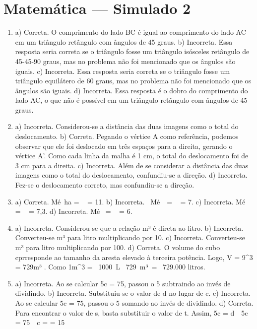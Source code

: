 \section*{Matemática — Simulado 2}

\begin{enumerate}
\item a) Correta. O comprimento do lado BC é igual ao comprimento do lado AC em um triângulo retângulo com ângulos de 45 graus.
b) Incorreta. Essa resposta seria correta se o triângulo fosse um triângulo isósceles retângulo de 45-45-90 graus, mas no problema não foi mencionado que os ângulos são iguais.
c) Incorreta. Essa resposta seria correta se o triângulo fosse um triângulo equilátero de 60 graus, mas no problema não foi mencionado que os ângulos são iguais.
d) Incorreta. Essa resposta é o dobro do comprimento do lado AC, o que não é possível em um triângulo retângulo com ângulos de 45 graus.


\item a) Incorreta. Considerou-se a distância das duas imagens como o total do deslocamento.
b) Correta. Pegando o vértice A como referência, podemos observar que ele foi deslocado em três espaços para a direita, gerando o vértice
A'. Como cada linha da malha é 1 cm, o total do deslocamento foi de 3 cm para a direita.
c) Incorreta. Além de se considerar a distância das duas imagens como o total do deslocamento, confundiu-se a direção.
d) Incorreta. Fez-se o deslocamento correto, mas confundiu-se a direção.

\item a) Correta.
Mé\ ha = \  = 11.
b) Incorreta.
\ Mé\ \  = \  = 7.
c) Incorreta.
Mé\  = \  = 7,3.
d) Incorreta.
Mé\  = \  = 6.


\item a) Incorreta. Considerou-se que a relação m³ é direta ao litro.
b) Incorreta. Converteu-se m³ para litro multiplicando por 10.
c) Incorreta. Converteu-se m³ para litro multiplicando por 100.
d) Correta. O volume do cubo cprresponde ao tamanho da aresta elevado à terceira potência. Logo, V = 9^{3} = 729m³ . Como
1m^{3} = \ 1000\ L \rightarrow \ 729\ m³\  = \ 729.000 litros.


\item a) Incorreta. Ao se calcular 5c = 75, passou o 5 subtraindo ao invés de dividindo.
b) Incorreta. Substituiu-se o valor de d no lugar de c.
c) Incorreta. Ao se calcular 5c = 75, passou o 5 somando ao invés de dividindo.
d) Correta. Para encontrar o valor de s, basta substituir o valor de t. Assim, 5c = d\  \rightarrow \ 5c = 75\  \rightarrow \ c =  = 15
\end{enumerate}

